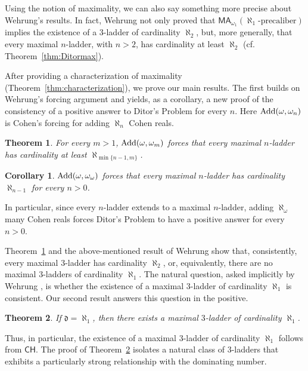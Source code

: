 \documentclass[]{amsart}
\newtheorem{maintheorem}{Theorem}
\newtheorem{maincorollary}{Corollary}
\theoremstyle{definition}
\theoremstyle{remark}
\begin{document}
Using the notion of maximality, we can also say something more precise about Wehrung's results. In fact, Wehrung not only proved that $\mathsf{MA}_{\omega_1}(\aleph_1\text{-precaliber})$ implies the existence of a $3$-ladder of cardinality $\aleph_2$, but, more generally, that every maximal $n$-ladder, with $n > 2$, has cardinality at least $\aleph_2$ (cf. Theorem~\ref{thm:Ditormax}).


After providing a characterization of maximality (Theorem~\ref{thm:characterization}), we prove our main results. The first builds on Wehrung’s forcing argument and yields, as a corollary, a new proof of the consistency of a positive answer to Ditor’s Problem for every $n$.  Here $\text{\upshape Add}(\omega, \omega_{n})$ is Cohen's forcing for adding $\aleph_{n}$ Cohen reals.

\begin{maintheorem}\label{thm:main1}
For every $m > 1$, $\text{\upshape Add}(\omega, \omega_{m})$ forces that every maximal $n$-ladder has cardinality at least $\aleph_{\min\{n-1, m\}}$. 
\end{maintheorem}
\begin{maincorollary}\label{cor:main1}
$\text{\upshape Add}(\omega, \omega_\omega)$ forces that every maximal $n$-ladder has cardinality $\aleph_{n-1}$ for every $n> 0$.
\end{maincorollary}

In particular, since every $n$-ladder extends to a maximal $n$-ladder, adding $\aleph_\omega$ many Cohen reals forces Ditor's Problem to have a positive answer for every $n > 0$.  

Theorem~\ref{thm:main1} and the above-mentioned result of Wehrung show that, consistently, every maximal $3$-ladder has cardinality $\aleph_2$, or, equivalently, there are no maximal $3$-ladders of cardinality $\aleph_1$. The natural question, asked implicitly by Wehrung \cite[p. 7]{MR2609217}, is whether the existence of a maximal $3$-ladder of cardinality $\aleph_1$ is consistent. Our second result answers this question in the positive.

\begin{maintheorem}\label{thm:main2}
If $\mathfrak{d}=\aleph_1$, then there exists a maximal $3$-ladder of cardinality $\aleph_1$.
\end{maintheorem}
Thus, in particular, the existence of a maximal $3$-ladder of cardinality $\aleph_1$ follows from $\mathsf{CH}$. The proof of Theorem~\ref{thm:main2} isolates a natural class of $3$-ladders that exhibits a particularly strong relationship with the dominating number.
\end{document}
